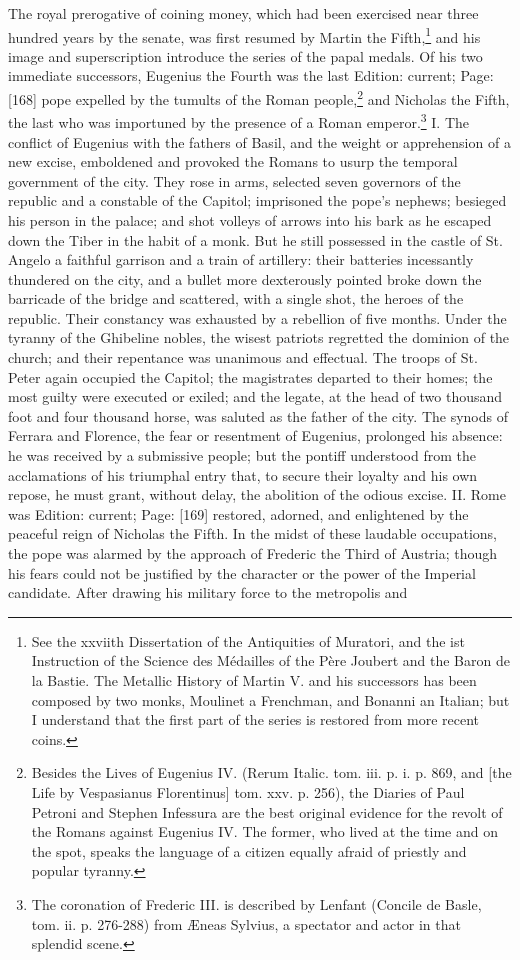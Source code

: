 The royal prerogative of coining money, which had been exercised near three hundred years by the senate, was first resumed by Martin the Fifth,\footnote{See the xxviith Dissertation of the Antiquities of Muratori, and the ist Instruction of the Science des Médailles of the Père Joubert and the Baron de la Bastie. The Metallic History of Martin V. and his successors has been composed by two monks, Moulinet a Frenchman, and Bonanni an Italian; but I understand that the first part of the series is restored from more recent coins.} and his image and superscription introduce the series of the papal medals. Of his two immediate successors, Eugenius the Fourth was the last Edition: current; Page: [168] pope expelled by the tumults of the Roman people,\footnote{Besides the Lives of Eugenius IV. (Rerum Italic. tom. iii. p. i. p. 869, and [the Life by Vespasianus Florentinus] tom. xxv. p. 256), the Diaries of Paul Petroni and Stephen Infessura are the best original evidence for the revolt of the Romans against Eugenius IV. The former, who lived at the time and on the spot, speaks the language of a citizen equally afraid of priestly and popular tyranny.} and Nicholas the Fifth, the last who was importuned by the presence of a Roman emperor.\footnote{The coronation of Frederic III. is described by Lenfant (Concile de Basle, tom. ii. p. 276-288) from Æneas Sylvius, a spectator and actor in that splendid scene.} I. The conflict of Eugenius with the fathers of Basil, and the weight or apprehension of a new excise, emboldened and provoked the Romans to usurp the temporal government of the city. They rose in arms, selected seven governors of the republic and a constable of the Capitol; imprisoned the pope\texthebrew{}’s nephews; besieged his person in the palace; and shot volleys of arrows into his bark as he escaped down the Tiber in the habit of a monk. But he still possessed in the castle of St. Angelo a faithful garrison and a train of artillery: their batteries incessantly thundered on the city, and a bullet more dexterously pointed broke down the barricade of the bridge and scattered, with a single shot, the heroes of the republic. Their constancy was exhausted by a rebellion of five months. Under the tyranny of the Ghibeline nobles, the wisest patriots regretted the dominion of the church; and their repentance was unanimous and effectual. The troops of St. Peter again occupied the Capitol; the magistrates departed to their homes; the most guilty were executed or exiled; and the legate, at the head of two thousand foot and four thousand horse, was saluted as the father of the city. The synods of Ferrara and Florence, the fear or resentment of Eugenius, prolonged his absence: he was received by a submissive people; but the pontiff understood from the acclamations of his triumphal entry that, to secure their loyalty and his own repose, he must grant, without delay, the abolition of the odious excise. II. Rome was Edition: current; Page: [169] restored, adorned, and enlightened by the peaceful reign of Nicholas the Fifth. In the midst of these laudable occupations, the pope was alarmed by the approach of Frederic the Third of Austria; though his fears could not be justified by the character or the power of the Imperial candidate. After drawing his military force to the metropolis and 